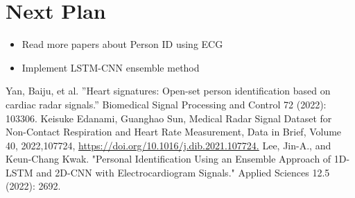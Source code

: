 \documentclass[dvipdfmx]{article}
\begin{document}
\section{Next Plan}
\begin{itemize}
    \item Read more papers about Person ID using ECG 
    \item Implement LSTM-CNN ensemble method
\end{itemize}
\begin{thebibliography}{99}
 Yan, Baiju, et al. ”Heart signatures: Open-set person identification based on cardiac radar signals.” Biomedical Signal Processing and Control 72 (2022): 103306.
 Keisuke Edanami, Guanghao Sun, Medical Radar Signal Dataset for Non-Contact Respiration and Heart Rate Measurement, Data in Brief, Volume 40, 2022,107724, \url{https://doi.org/10.1016/j.dib.2021.107724.}
 Lee, Jin-A., and Keun-Chang Kwak. "Personal Identification Using an Ensemble Approach of 1D-LSTM and 2D-CNN with Electrocardiogram Signals." Applied Sciences 12.5 (2022): 2692.
\end{thebibliography}
\end{document}
